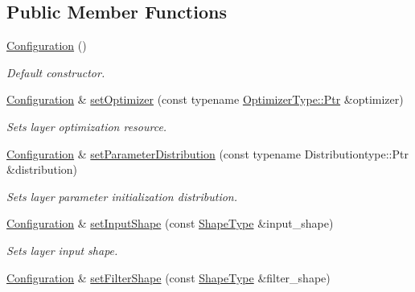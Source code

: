 \subsection*{Public Member Functions}
\begin{DoxyCompactItemize}
\item 
\hyperlink{classffnn_1_1layer_1_1_convolution_1_1_configuration_a1c4df8e851c7205c80ddeb35f05ae7c4}{Configuration} ()
\begin{DoxyCompactList}\small\item\em Default constructor. \end{DoxyCompactList}\item 
\hyperlink{classffnn_1_1layer_1_1_convolution_1_1_configuration}{Configuration} \& \hyperlink{classffnn_1_1layer_1_1_convolution_1_1_configuration_a13f1eeca186c18bc1d1d95dcbc7572c0}{set\-Optimizer} (const typename \hyperlink{classffnn_1_1optimizer_1_1_optimizer_ac03e7181934bf0c12a97fc67a60484ab}{Optimizer\-Type\-::\-Ptr} \&optimizer)
\begin{DoxyCompactList}\small\item\em Sets layer optimization resource. \end{DoxyCompactList}\item 
\hyperlink{classffnn_1_1layer_1_1_convolution_1_1_configuration}{Configuration} \& \hyperlink{classffnn_1_1layer_1_1_convolution_1_1_configuration_a9a8c8d9ecfbb6cbbe02e9b0d4cbab0d5}{set\-Parameter\-Distribution} (const typename Distributiontype\-::\-Ptr \&distribution)
\begin{DoxyCompactList}\small\item\em Sets layer parameter initialization distribution. \end{DoxyCompactList}\item 
\hyperlink{classffnn_1_1layer_1_1_convolution_1_1_configuration}{Configuration} \& \hyperlink{classffnn_1_1layer_1_1_convolution_1_1_configuration_a66f5875cd02f5f632860b08cb18a411d}{set\-Input\-Shape} (const \hyperlink{classffnn_1_1layer_1_1_convolution_a70e1c8cd31ce4b5eef308c4b036d8393}{Shape\-Type} \&input\-\_\-shape)
\begin{DoxyCompactList}\small\item\em Sets layer input shape. \end{DoxyCompactList}\item 
\hyperlink{classffnn_1_1layer_1_1_convolution_1_1_configuration}{Configuration} \& \hyperlink{classffnn_1_1layer_1_1_convolution_1_1_configuration_af99746e574944cf6c22045e466f41043}{set\-Filter\-Shape} (const \hyperlink{classffnn_1_1layer_1_1_convolution_a70e1c8cd31ce4b5eef308c4b036d8393}{Shape\-Type} \&filter\-\_\-shape)

\end{DoxyCompactItemize}
